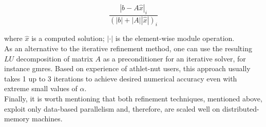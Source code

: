 \begin{equation} \label{eq:backward-error}
\frac{|b - A\hat{x}|_{i}}{(|b| + |A| |\hat{x}|)_{i}}
\end{equation}

where $\hat{x}$ is a computed solution; $|\cdot|$ is the element-wise module operation.\\



As an alternative to the iterative refinement method, one can use the resulting $LU$ decomposition of matrix $A$ as a preconditioner for an iterative solver, for instance \acrshort{gmres}. Based on experience of \acrshort{athlet}-\acrshort{nut} users, this approach usually takes 1 up to 3 iterations to achieve desired numerical accuracy even with extreme small values of $\alpha$.\\

Finally, it is worth mentioning that both refinement techniques, mentioned above, exploit only data-based parallelism and, therefore, are scaled well on distributed-memory machines.\\

